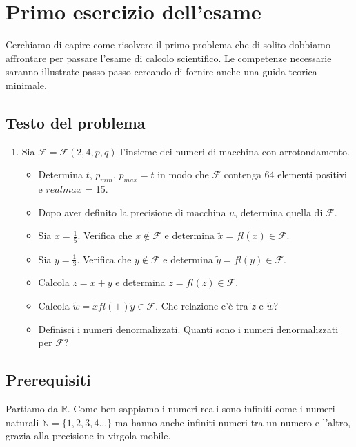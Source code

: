 \section{Primo esercizio dell'esame}

Cerchiamo di capire come risolvere il primo problema che di solito dobbiamo affrontare per passare l'esame di calcolo scientifico. Le competenze necessarie saranno illustrate passo passo cercando di fornire anche una guida teorica minimale.

\subsection{Testo del problema}
\begin{enumerate}
  \item Sia $ \mathcal{F} = \mathcal{F}(2,4,p,q) $ l'insieme dei numeri di macchina con arrotondamento.
  \begin{itemize}
    \item Determina $t$, $p_{min}$, $p_{max} = t$ in modo che $\mathcal{F}$ contenga 64 elementi positivi e $realmax$ = 15.
    \item Dopo aver definito la precisione di macchina $ u $, determina quella di $ \mathcal{F} $.
    \item Sia $ x = \frac{1}{5} $. Verifica che $ x \notin \mathcal{F} $ e determina $ \tilde{x} = fl(x) \in \mathcal{F} $.
    \item Sia $ y = \frac{1}{3} $. Verifica che $ y \notin \mathcal{F} $ e determina $ \tilde{y} = fl(y) \in \mathcal{F} $.
    \item Calcola $ z = x + y $ e determina $ \tilde{z} = fl(z) \in \mathcal{F} $.
    \item Calcola $ \tilde{w} = \tilde{x} fl(+) \tilde{y} \in \mathcal{F}$. Che relazione c'è tra $\tilde{z}$ e $\tilde{w}$?
    \item Definisci i numeri denormalizzati. Quanti sono i numeri denormalizzati per $\mathcal{F}$?
  \end{itemize}
\end{enumerate}

\subsection{Prerequisiti}
Partiamo da $\mathbb{R}$. Come ben sappiamo i numeri reali sono infiniti come i numeri naturali $\mathbb{N} = \{1,2,3,4...\}$ ma hanno anche infiniti numeri tra un numero e l'altro, grazia alla precisione in virgola mobile.\bigskip

